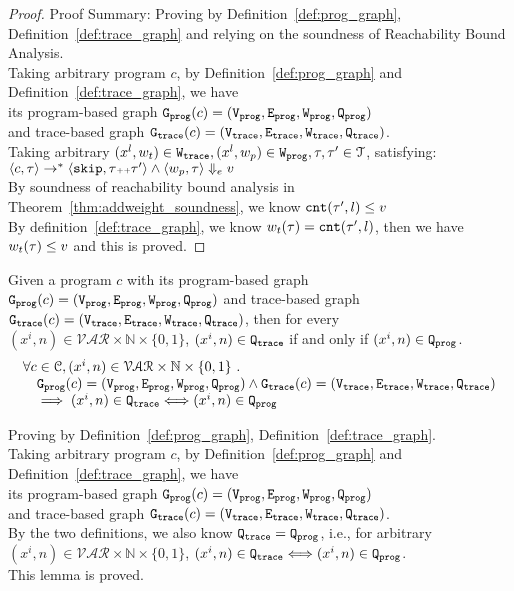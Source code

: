 \begin{proof}
Proof Summary: Proving by Definition~\ref{def:prog_graph}, Definition~\ref{def:trace_graph} and relying on the soundness of Reachability Bound 
Analysis.
\\
Taking arbitrary program $c$,
by Definition~\ref{def:prog_graph} and Definition~\ref{def:trace_graph}, 
we have   
\\
its program-based graph $\mathtt{{G_{prog}}}({c}) = (\mathtt{{V_{prog}}}, \mathtt{{E_{prog}}}, \mathtt{{W_{prog}}}, \mathtt{{Q_{prog}}})$ 
\\
and 
trace-based graph $\mathtt{{G_{trace}}}({c}) = (\mathtt{{V_{trace}}}, \mathtt{{E_{trace}}}, \mathtt{{W_{trace}}}, \mathtt{{Q_{trace}}})$.
\\
Taking arbitrary 
$(x^l, w_{t}) \in \mathtt{{W_{trace}}}, (x^l, w_{p}) \in \mathtt{{W_{prog}}}, \mathtt{\tau}, \mathtt{\tau}' \in \mathcal{T}$, satisfying:
\\
$\langle {c}, \mathtt{\tau} \rangle \to^{*} \langle \mathtt{skip}, \mathtt{\tau}{\scriptscriptstyle ++}\mathtt{\tau}' \rangle 
\land 
\langle w_{p}, \mathtt{\tau} \rangle \Downarrow_e v$
\\
By soundness of reachability bound analysis in Theorem~\ref{thm:addweight_soundness}, we know 
$\mathtt{cnt}(\mathtt{\tau}', l) \leq v$
\\
By definition~\ref{def:trace_graph}, we know $w_t(\mathtt{\tau}) = \mathtt{cnt}(\mathtt{\tau}', l)$,
then we have $w_t(\mathtt{\tau}) \leq v$ and this is proved.
\end{proof}
%
\begin{lem}
	\label{lem:queryvertex_map}
	Given a program $c$ with its
	program-based graph $\mathtt{{G_{prog}}}({c}) = (\mathtt{{V_{prog}}}, \mathtt{{E_{prog}}}, \mathtt{{W_{prog}}}, \mathtt{{Q_{prog}}})$
	and 
	trace-based graph $\mathtt{{G_{trace}}}({c}) = (\mathtt{{V_{trace}}}, \mathtt{{E_{trace}}}, \mathtt{{W_{trace}}}, \mathtt{{Q_{trace}}})$,
	then for every $(x^i, n) \in \mathcal{VAR} \times \mathbb{N}  \times \{0, 1\} $,
	 $(x^i, n) \in \mathtt{{Q_{trace}}}$ if and only if $ (x^i, n) \in \mathtt{{Q_{prog}}}$.
	\[
	\begin{array}{l}
	\forall c \in \mathcal{C} , (x^i, n) \in \mathcal{VAR} \times \mathbb{N}  \times \{0, 1\} 
	 ~.~ 
	 \\ \quad
	 \mathtt{{G_{prog}}}({c}) = (\mathtt{{V_{prog}}}, \mathtt{{E_{prog}}}, \mathtt{{W_{prog}}}, \mathtt{{Q_{prog}}})
	\land 
	\mathtt{{G_{trace}}}({c}) = (\mathtt{{V_{trace}}}, \mathtt{{E_{trace}}}, \mathtt{{W_{trace}}}, \mathtt{{Q_{trace}}})
	\\ \quad
	\implies
	(x^i, n) \in \mathtt{{Q_{trace}}} \Longleftrightarrow  (x^i, n) \in \mathtt{{Q_{prog}}}
	\end{array}
	\]
	\end{lem}
\begin{subproof}
Proving by Definition~\ref{def:prog_graph}, Definition~\ref{def:trace_graph}.
\\
Taking arbitrary program $c$,
by Definition~\ref{def:prog_graph} and Definition~\ref{def:trace_graph}, 
we have   
\\
its program-based graph $\mathtt{{G_{prog}}}({c}) = (\mathtt{{V_{prog}}}, \mathtt{{E_{prog}}}, \mathtt{{W_{prog}}}, \mathtt{{Q_{prog}}})$ 
\\
and 
trace-based graph $\mathtt{{G_{trace}}}({c}) = (\mathtt{{V_{trace}}}, \mathtt{{E_{trace}}}, \mathtt{{W_{trace}}}, \mathtt{{Q_{trace}}})$.
\\
By the two definitions, we also know $\mathtt{{Q_{trace}}}  = \mathtt{{Q_{prog}}}$, 
i.e., 
for arbitrary $ (x^i, n) \in \mathcal{VAR} \times \mathbb{N}  \times \{0, 1\} $,
 $(x^i, n) \in \mathtt{{Q_{trace}}} \Longleftrightarrow  (x^i, n) \in \mathtt{{Q_{prog}}}$.
 \\
 This lemma is proved.
\end{subproof}
